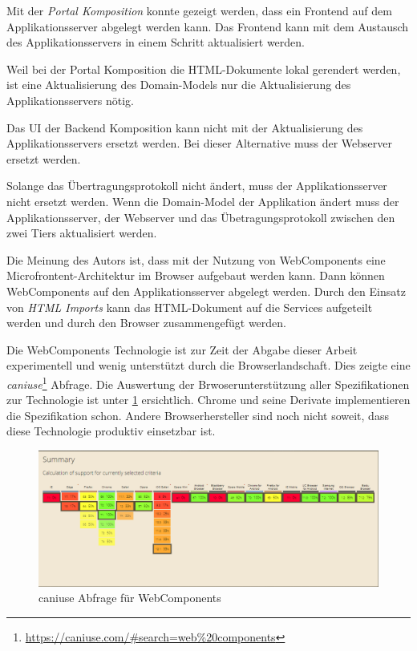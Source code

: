 Mit der  \textit{Portal Komposition} konnte gezeigt werden, dass ein Frontend auf dem Applikationsserver abgelegt werden kann. Das Frontend kann mit dem Austausch des Applikationsservers in einem Schritt aktualisiert werden. 

Weil bei der Portal Komposition die \ac{HTML}-Dokumente lokal gerendert werden, ist eine Aktualisierung des Domain-Models nur die Aktualisierung des Applikationsservers nötig.

Das \ac{UI} der  Backend Komposition kann nicht mit der Aktualisierung des Applikationsservers ersetzt werden. Bei dieser Alternative muss der Webserver ersetzt werden. 

Solange das Übertragungsprotokoll nicht ändert, muss der Applikationsserver nicht ersetzt werden. Wenn die Domain-Model der Applikation ändert muss der Applikationsserver, der Webserver und das Übetragungsprotokoll zwischen den zwei Tiers aktualisiert werden.

Die Meinung  des Autors ist, dass mit der Nutzung von WebComponents eine Microfrontent-Architektur im Browser aufgebaut werden kann. Dann können WebComponents auf den Applikationsserver abgelegt werden. Durch den Einsatz von \textit{HTML Imports}\cite{w3cHtmlImports} kann das HTML-Dokument auf die Services aufgeteilt werden und durch den Browser zusammengefügt werden.

Die WebComponents Technologie ist zur Zeit der Abgabe dieser Arbeit experimentell und wenig unterstützt durch die Browserlandschaft. Dies zeigte eine \textit{caniuse}\footnote{\url{https://caniuse.com/\#search=web\%20components}} Abfrage. Die Auswertung der Brwoserunterstützung aller Spezifikationen zur Technologie ist unter \ref{fig:results:main:WebComponents}  ersichtlich. Chrome und seine Derivate implementieren die Spezifikation schon. Andere Browserhersteller sind noch nicht soweit, dass diese Technologie produktiv einsetzbar ist.

\begin{figure}
    \centering
    \includegraphics[width=\textwidth]{sections/results/WebComponents.png}
    \caption{caniuse Abfrage für WebComponents}
    \label{fig:results:main:WebComponents}
\end{figure}

